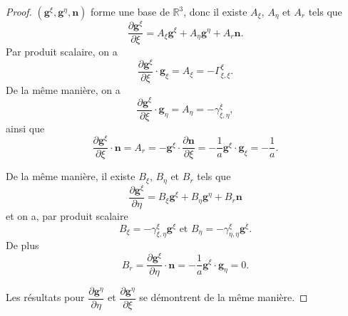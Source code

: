 \begin{proof}
$(\mathbf{g}^{\xi}, \mathbf{g}^{\eta}, \mathbf{n})$ forme une base de $\mathbb{R}^3$, donc il existe $A_{\xi}$, $A_{\eta}$ et $A_r$ tels que 
\begin{equation}
\dfrac{\partial \mathbf{g}^{\xi}}{\partial \xi} = A_{\xi} \mathbf{g}^{\xi} + A_{\eta} \mathbf{g}^{\eta} + A_r \mathbf{n}.
\end{equation}
Par produit scalaire, on a 
\begin{equation}
\dfrac{\partial \mathbf{g}^{\xi}}{\partial \xi} \cdot \mathbf{g}_{\xi} = A_{\xi} = - \Gamma_{\xi, \xi}^{\xi}.
\end{equation}
De la même manière, on a 
\begin{equation}
\dfrac{\partial \mathbf{g}^{\xi}}{\partial \xi} \cdot \mathbf{g}_{\eta} = A_{\eta} = - \gamma_{\xi, \eta}^{\xi},
\end{equation}
ainsi que
\begin{equation}
\dfrac{\partial \mathbf{g}^{\xi}}{\partial \xi} \cdot \mathbf{n} = A_r = - \mathbf{g}^{\xi} \cdot \dfrac{\partial \mathbf{n}}{\partial \xi} = - \dfrac{1}{a} \mathbf{g}^{\xi} \cdot \mathbf{g}_{\xi} = -\dfrac{1}{a}.
\end{equation}

De la même manière, il existe $B_{\xi}$, $B_{\eta}$ et $B_r$ tels que
\begin{equation}
\dfrac{\partial \mathbf{g}^{\xi}}{\partial \eta} = B_{\xi} \mathbf{g}^{\xi} + B_{\eta} \mathbf{g}^{\eta} + B_r \mathbf{n}
\end{equation}
et on a, par produit scalaire
\begin{equation}
B_{\xi} = - \gamma_{\xi, \eta}^{\xi} \mathbf{g}^{\xi} \text{ et } B_{\eta} = - \gamma_{\eta, \eta}^{\xi} \mathbf{g}^{\xi}.
\end{equation}
De plus
\begin{equation}
B_r = \dfrac{\partial \mathbf{g}^{\xi}}{\partial \eta} \cdot \mathbf{n} = - \dfrac{1}{a} \mathbf{g}^{\xi} \cdot \mathbf{g}_{\eta} = 0.
\end{equation}

Les résultats pour $\dfrac{\partial \mathbf{g}^{\eta}}{\partial \eta}$ et $\dfrac{\partial \mathbf{g}^{\eta}}{\partial \xi}$ se démontrent de la même manière.
\end{proof}


